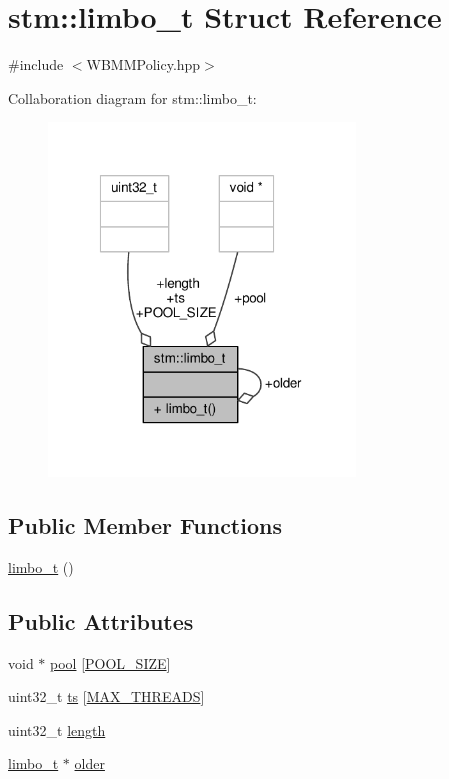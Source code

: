 \hypertarget{structstm_1_1limbo__t}{\section{stm\-:\-:limbo\-\_\-t Struct Reference}
\label{structstm_1_1limbo__t}
}


{\ttfamily \#include $<$W\-B\-M\-M\-Policy.\-hpp$>$}



Collaboration diagram for stm\-:\-:limbo\-\_\-t\-:
\nopagebreak
\begin{figure}[H]
\begin{center}
\leavevmode
\includegraphics[width=231pt]{structstm_1_1limbo__t__coll__graph}
\end{center}
\end{figure}
\subsection*{Public Member Functions}
\begin{DoxyCompactItemize}
\item 
\hyperlink{structstm_1_1limbo__t_a039326ffe2ac66e026d84f7ca0e9942a}{limbo\-\_\-t} ()
\end{DoxyCompactItemize}
\subsection*{Public Attributes}
\begin{DoxyCompactItemize}
\item 
void $\ast$ \hyperlink{structstm_1_1limbo__t_a2959f4e11ae87efa4f4f6a0109695872}{pool} \mbox{[}\hyperlink{structstm_1_1limbo__t_a5f5c9d483ce76b1ca74b299e1717ba84}{P\-O\-O\-L\-\_\-\-S\-I\-Z\-E}\mbox{]}
\item 
uint32\-\_\-t \hyperlink{structstm_1_1limbo__t_af36c88026240d9d0a9940c759c18cc3a}{ts} \mbox{[}\hyperlink{namespacestm_a41da58ff755b92c2c2903c8e2844f6c4}{M\-A\-X\-\_\-\-T\-H\-R\-E\-A\-D\-S}\mbox{]}
\item 
uint32\-\_\-t \hyperlink{structstm_1_1limbo__t_ab2c5d9c55b56444834b44cb76063a1e3}{length}
\item 
\hyperlink{structstm_1_1limbo__t}{limbo\-\_\-t} $\ast$ \hyperlink{structstm_1_1limbo__t_a77a04c6b5a6ca290eb745c4278ed0272}{older}
\end{DoxyCompactItemize}
